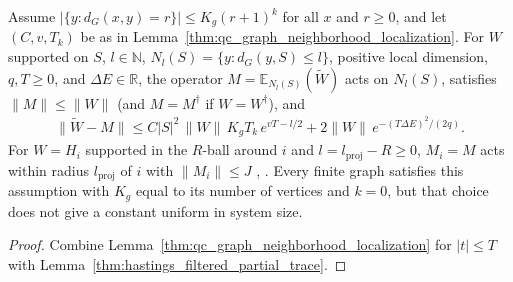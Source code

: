 \begin{lemma}
    \label{thm:hastings05_filtered_approximation_graph}
    \leanok
    Assume $|\{y:d_G(x,y)=r\}|\le K_g(r+1)^k$ for all $x$ and $r\ge0$, and let
    $(C,v,T_k)$ be as in Lemma~\ref{thm:qc_graph_neighborhood_localization}.
    For $W$ supported on $S$, $l\in\mathbb N$, $N_l(S)=\{y:d_G(y,S)\le l\}$,
    positive local dimension, $q,T\ge0$, and $\Delta E\in\mathbb R$, the
    operator $M=\mathbb E_{N_l(S)}(\widetilde W)$ acts on $N_l(S)$, satisfies
    $\|M\|\le\|W\|$ (and $M=M^\dagger$ if $W=W^\dagger$), and
    \begin{align}
        \|\widetilde W-M\|\le C|S|^2\,\|W\|\,K_gT_k\,e^{vT-l/2}
        +2\|W\|\,e^{-(T\Delta E)^2/(2q)}.
        \label{eq:hastings05_filtered_graph_approximation}
    \end{align}
    For $W=H_i$ supported in the $R$-ball around $i$ and
    $l=l_{\mathrm{proj}}-R\ge0$, $M_i=M$ acts within radius
    $l_{\mathrm{proj}}$ of $i$ with $\|M_i\|\le J$
    \cite[lines 285--320]{Hastings2006Solving},
    \cite{gap:hastings05_filtered_term_approximation}.
    Every finite graph satisfies this assumption with $K_g$ equal to its
    number of vertices and $k=0$, but that choice does not give a constant
    uniform in system size\cite{gap:hastings05_geometric_growth_scope}.
\end{lemma}
\begin{proof}\leanok
    Combine Lemma~\ref{thm:qc_graph_neighborhood_localization} for $|t|\le T$
    with Lemma~\ref{thm:hastings_filtered_partial_trace}.
\end{proof}

